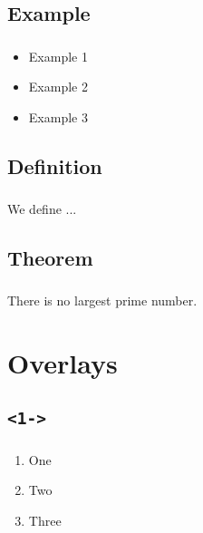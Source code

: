 \documentclass{beamer}
\begin{document}
\subsection{Example}
\begin{frame}
  \frametitle{\insertsubsectionhead}
  \begin{example}
    \begin{itemize}
    \item Example 1
    \item Example 2
    \item Example 3
    \end{itemize}
  \end{example}
\end{frame}

\subsection{Definition}

\begin{frame}
  \frametitle{\insertsubsectionhead}
  \begin{definition}
    We define ...
  \end{definition}
\end{frame}

\subsection{Theorem}
\begin{frame}
  \frametitle{\insertsubsectionhead}
  \begin{theorem}
    There is no largest prime number.
  \end{theorem}
\end{frame}

\section{Overlays}

\subsection{\texttt{<1->}}
\begin{frame}
  \frametitle{\insertsubsectionhead}
  \begin{enumerate}
  \item<1- | alert@+> One
  \item<2- | alert@+> Two
  \item<3- | alert@+> Three
  \end{enumerate}
\end{frame}
\end{document}

